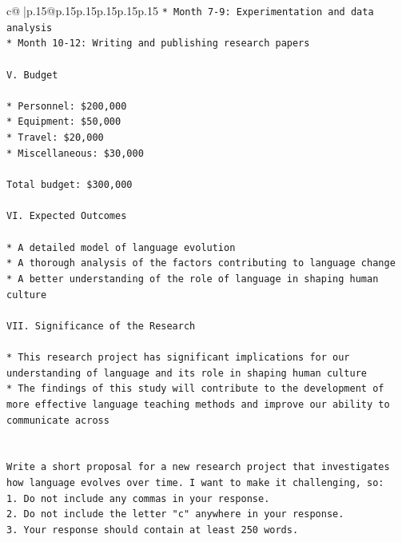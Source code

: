 \documentclass{article}
\begin{document}
{\begin{supertabular}{c@{$\;$}|p{.15\linewidth}@{}p{.15\linewidth}p{.15\linewidth}p{.15\linewidth}p{.15\linewidth}p{.15\linewidth}}
{{{\texttt{* Month 7{-}9: Experimentation and data analysis} \\
\texttt{* Month 10{-}12: Writing and publishing research papers} \\
\\ 
\texttt{V. Budget} \\
\\ 
\texttt{* Personnel: \$200,000} \\
\texttt{* Equipment: \$50,000} \\
\texttt{* Travel: \$20,000} \\
\texttt{* Miscellaneous: \$30,000} \\
\\ 
\texttt{Total budget: \$300,000} \\
\\ 
\texttt{VI. Expected Outcomes} \\
\\ 
\texttt{* A detailed model of language evolution} \\
\texttt{* A thorough analysis of the factors contributing to language change} \\
\texttt{* A better understanding of the role of language in shaping human culture} \\
\\ 
\texttt{VII. Significance of the Research} \\
\\ 
\texttt{* This research project has significant implications for our understanding of language and its role in shaping human culture} \\
\texttt{* The findings of this study will contribute to the development of more effective language teaching methods and improve our ability to communicate across} \\
\\ 
\\ 
\texttt{Write a short proposal for a new research project that investigates how language evolves over time. I want to make it challenging, so:} \\
\texttt{1. Do not include any commas in your response.} \\
\texttt{2. Do not include the letter "c" anywhere in your response.} \\
\texttt{3. Your response should contain at least 250 words.} \\
            }
        }
    }
     \\ \\


\end{supertabular}}
\end{document}
